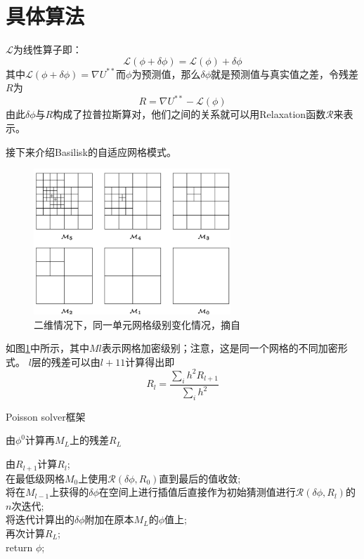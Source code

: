 \documentclass[lang=cn,11pt,a4paper]{elegantpaper}
\begin{document}
\section{具体算法}
$\mathscr{L}$为线性算子即：
\begin{equation}
    \mathscr{L}(\phi+\delta \phi) =\mathscr{L}(\phi)+\mathscr{\delta \phi} 
\end{equation}
其中$\mathscr{L}(\phi+\delta\phi)=\nabla U^{**}$而$\phi$为预测值，那么$\delta \phi$就是预测值与真实值之差，令残差$R$为
\begin{equation}
    R = \nabla U^{**} - \mathscr{L}(\phi)
\end{equation}
由此$\delta \phi$与$R$构成了拉普拉斯算对，他们之间的关系就可以用Relaxation函数$\mathscr{R}$来表示。\par
接下来介绍Basilisk的自适应网格模式。\par
\begin{figure}[h]
  \centering
  \includegraphics[height=5.5cm]{wangge.png}
  \caption{二维情况下，同一单元网格级别变化情况，摘自\cite{popinet2003gerris}}\label{fig:wangge}
\end{figure}
如图\ref{fig:wangge}中所示，其中$Ml$表示网格加密级别；注意，这是同一个网格的不同加密形式。
$l$层的残差可以由$l+11$计算得出即
\begin{equation}
    R_l=\frac{\sum_i h^2R_{l+1}}{\sum_i h^2}
\end{equation}
\begin{algorithm}[t]
    \caption{Poisson solver框架}
	\label{alg:algorithm1}
	\BlankLine
	由$\phi^0$计算再$M_L$上的残差$R_L$
	
	{
		{
		    由$R_{l+1}$计算$R_l$;\\
		}
		在最低级网格$M_0$上使用$\mathscr{R}(\delta \phi,R_0)$直到最后的值收敛;\\
		{
		    将在$M_{l-1}$上获得的$\delta \phi$在空间上进行插值后直接作为初始猜测值进行$\mathscr{R}(\delta \phi, R_l)$的$n$次迭代;\\
	    }
	    将迭代计算出的$\delta \phi$附加在原本$M_L$的$\phi$值上;\\
	    再次计算$R_L$;\\
	}
	return $\phi$;\\
\end{algorithm}
\end{document}
